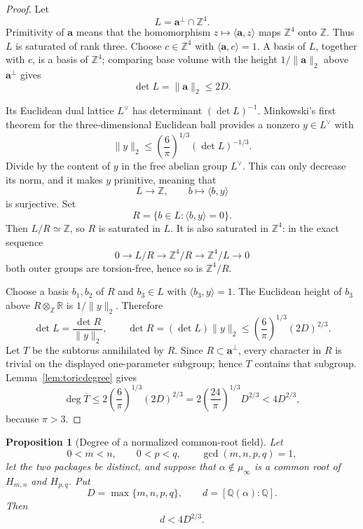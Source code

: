 \documentclass[11pt]{article}
\newtheorem{proposition}[theorem]{Proposition}
\theoremstyle{definition}
\newcommand{\Q}{\mathbb Q}
\newcommand{\Z}{\mathbb Z}
\begin{document}
\begin{proof}
Let
\[
 L=\boldsymbol a^\perp\cap\Z^4.
\]
Primitivity of \(\boldsymbol a\) means that the homomorphism
\(z\mapsto\langle\boldsymbol a,z\rangle\) maps \(\Z^4\) onto \(\Z\).
Thus \(L\) is saturated of rank three.  Choose \(c\in\Z^4\) with
\(\langle\boldsymbol a,c\rangle=1\).  A basis of \(L\), together with
\(c\), is a basis of \(\Z^4\); comparing base volume with the height
\(1/\|\boldsymbol a\|_2\) above \(\boldsymbol a^\perp\) gives
\[
 \det L=\|\boldsymbol a\|_2\leq2D.
\]

Its Euclidean dual lattice \(L^\vee\) has determinant
\((\det L)^{-1}\).  Minkowski's first theorem for the three-dimensional
Euclidean ball \cite[Chapter~III, \S2]{Cassels1997} provides a nonzero
\(y\in L^\vee\) with
\[
 \|y\|_2\leq
 \left(\frac6\pi\right)^{1/3}(\det L)^{-1/3}.
\]
Divide by the content of \(y\) in the free abelian group \(L^\vee\).
This can only decrease its norm, and it makes \(y\) primitive, meaning that
\[
 L\longrightarrow\Z,
 \qquad b\longmapsto\langle b,y\rangle
\]
is surjective.  Set
\[
 R=\{b\in L:\langle b,y\rangle=0\}.
\]
Then \(L/R\simeq\Z\), so \(R\) is saturated in \(L\).  It is also
saturated in \(\Z^4\): in the exact sequence
\[
 0\longrightarrow L/R\longrightarrow\Z^4/R
 \longrightarrow\Z^4/L\longrightarrow0
\]
both outer groups are torsion-free, hence so is \(\Z^4/R\).

Choose a basis \(b_1,b_2\) of \(R\) and \(b_3\in L\) with
\(\langle b_3,y\rangle=1\).  The Euclidean height of \(b_3\) above
\(R\otimes_{\Z}\mathbb R\) is \(1/\|y\|_2\).  Therefore
\[
 \det L=\frac{\det R}{\|y\|_2},
 \qquad
 \det R=(\det L)\|y\|_2
 \leq\left(\frac6\pi\right)^{1/3}(2D)^{2/3}.
\]
Let \(T\) be the subtorus annihilated by \(R\).  Since
\(R\subset\boldsymbol a^\perp\), every character in \(R\) is trivial on
the displayed one-parameter subgroup; hence \(T\) contains that subgroup.
Lemma~\ref{lem:toricdegree} gives
\[
 \deg\overline T
 \leq2\left(\frac6\pi\right)^{1/3}(2D)^{2/3}
 =2\left(\frac{24}{\pi}\right)^{1/3}D^{2/3}
 <4D^{2/3},
\]
because \(\pi>3\).
\end{proof}

\begin{proposition}[Degree of a normalized common-root field]
\label{prop:fielddegree}
Let
\[
 0<m<n,\qquad0<p<q,\qquad\gcd(m,n,p,q)=1,
\]
let the two packages be distinct, and suppose that
\(\alpha\notin\mu_\infty\) is a common root of
\(H_{m,n}\) and \(H_{p,q}\).  Put
\[
 D=\max\{m,n,p,q\},
 \qquad d=[\Q(\alpha):\Q].
\]
Then
\begin{equation}
 d<4D^{2/3}.
 \tag{17.10}
\end{equation}
\end{proposition}
\end{document}
